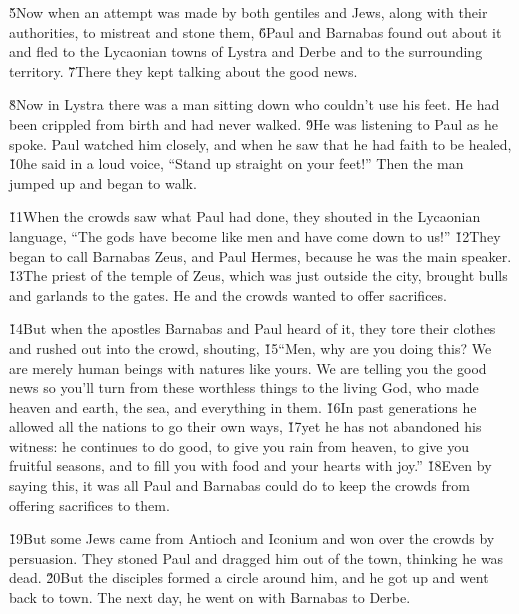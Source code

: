 \v{5}Now when an attempt was made by both gentiles and Jews, along with their authorities, to mistreat and stone them, \v{6}Paul and Barnabas found out about it and fled to the Lycaonian towns of Lystra and Derbe and to the surrounding territory. \v{7}There they kept talking about the good news.

\v{8}Now in Lystra there was a man sitting down who couldn't use his feet. He had been crippled from birth and had never walked. \v{9}He was listening to Paul as he spoke. Paul watched him closely, and when he saw that he had faith to be healed, \v{10}he said in a loud voice, ``Stand up straight on your feet!'' Then the man jumped up and began to walk.

\v{11}When the crowds saw what Paul had done, they shouted in the Lycaonian language, ``The gods have become like men and have come down to us!'' \v{12}They began to call Barnabas Zeus, and Paul Hermes, because he was the main speaker. \v{13}The priest of the temple of Zeus, which was just outside the city, brought bulls and garlands to the gates. He and the crowds wanted to offer sacrifices.

\v{14}But when the apostles Barnabas and Paul heard of it, they tore their clothes and rushed out into the crowd, shouting, \v{15}``Men, why are you doing this? We are merely human beings with natures like yours. We are telling you the good news so you'll turn from these worthless things to the living God, who made heaven and earth, the sea, and everything in them. \v{16}In past generations he allowed all the nations to go their own ways, \v{17}yet he has not abandoned his witness: he continues to do good, to give you rain from heaven, to give you fruitful seasons, and to fill you with food and your hearts with joy.'' \v{18}Even by saying this, it was all Paul and Barnabas could do to keep the crowds from offering sacrifices to them.

\v{19}But some Jews came from Antioch and Iconium and won over the crowds by persuasion. They stoned Paul and dragged him out of the town, thinking he was dead. \v{20}But the disciples formed a circle around him, and he got up and went back to town. The next day, he went on with Barnabas to Derbe.

